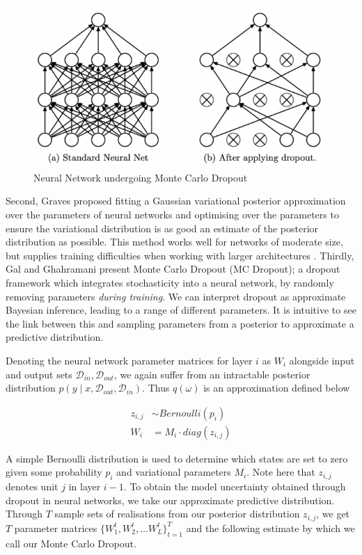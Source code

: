 \documentclass[ %
                    author={James Stephenson},
                supervisor={Dr. Edwin Simpson},
                    degree={MSc},
                     title={PROJECT PLAN},
                  subtitle={ Bayesian Deep Learning For Extractive Test Summarisation},
                      type={},
                      year={2022}]{../additions/dissertation}
\begin{document}
			\begin{figure}[h]
				\centering
				\includegraphics[width=0.5\linewidth]{../additions/figures/Srivastava14_MCDropout}
				\caption{Neural Network undergoing Monte Carlo Dropout \cite{Srivastava14}}
				\label{fig:MC_dropout}
			\end{figure}
			
			Second, Graves \cite{Graves11} proposed fitting a Gaussian variational posterior approximation over the parameters of neural networks and optimising over the parameters to ensure the variational distribution is as good an estimate of the posterior distribution as possible. This method works well for networks of moderate size, but supplies training difficulties when working with larger architectures \cite{He15}.
Thirdly, Gal and Ghahramani \cite{Gal15} present Monte Carlo Dropout (MC Dropout); a dropout framework which integrates stochasticity into a neural network, by randomly removing parameters \emph{during training}. We can interpret dropout as approximate Bayesian inference, leading to a range of different parameters. It is intuitive to see the link between this and sampling parameters from a posterior to approximate a predictive distribution.
			
			\medbreak
			Denoting the neural network parameter matrices for layer $i$ as $W_i$ alongside input and output sets $\mathcal{D}_{in}, \mathcal{D}_{out}$, we again suffer from an intractable posterior distribution $p(y \mid x, \mathcal{D}_{out}, \mathcal{D}_{in})$. Thus $q(\omega)$ is an approximation defined below
			
			\begin{align*}
				z_{i, j} &\sim Bernoulli(p_i) \\
				W_i &= M_i \cdot diag(z_{i,j})
			\end{align*}
			
			\noindent
			A simple Bernoulli distribution is used to determine which states are set to zero given some probability $p_i$ and variational parameters $M_i$. Note here that $z_{i,j}$ denotes unit $j$ in layer $i-1$. To obtain the model uncertainty obtained through dropout in neural networks, we take our approximate predictive distribution. Through $T$ sample sets of realisations from our posterior distribution $z_{i,j}$, we get $T$ parameter matrices $\{W^{t}_{1}, W^{t}_{2}, \ldots W^{t}_{L}\}^{T}_{t=1}$ and the following estimate by which we call our Monte Carlo Dropout.
			
\end{document}
